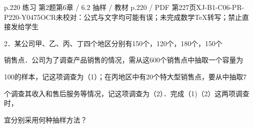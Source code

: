 \begin{bankitem}{p.220 练习 第2题}{第6章 / 6.2 抽样 / 教材 p.220 / PDF 第227页}{XJ-B1-C06-PR-P220-Y0475}{OCR未校对：公式与文字均可能有误；未完成数学TeX转写；禁止直接发给学生}
\begin{ocrdraft}
\par
2．某公司甲、乙、丙、丁四个地区分别有150个，120个，180个，150个
\par
销售点．公司为了调查产品销售的情况，需从这600个销售点中抽取一个容量为
\par
100的样本，记这项调查为（1）；在丙地区中有20个特大型销售点，要从中抽取7
\par
个调查其收入和售后服务等情况，记这项调查为（2）．完成（1)（2）这两项调查时，
\par
宜分别采用何种抽样方法？
\end{ocrdraft}
\end{bankitem}
